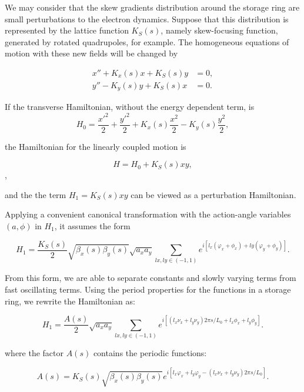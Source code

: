 We may consider that the skew gradients distribution around the storage ring are small perturbations to the electron dynamics. Suppose that this distribution is represented by the lattice function $K_S(s)$, namely skew-focusing function, generated by rotated quadrupoles, for example. The homogeneous equations of motion with these new fields will be changed by

\begin{align}
    x'' + K_x(s) x + K_S(s)y &=0, \\
    y'' - K_y(s) y + K_S(s)x &=0.
\end{align}

If the transverse Hamiltonian, without the energy dependent term, is 
\begin{equation*}
H_0 = \dfrac{{x'}^2}{2} + \dfrac{{y'}^2}{2} + K_x(s)\dfrac{{x}^2}{2} - K_y(s) \frac{y^2}{2},    
\end{equation*}

the Hamiltonian for the linearly coupled motion is 

\begin{equation*}
    H = H_0 + K_S(s) xy,
\end{equation*},

and the the term $H_1 = K_S(s) xy$ can be viewed as a perturbation Hamiltonian.

Applying a convenient canonical transformation with the action-angle variables $(a, \phi)$ in $H_1$, it assumes the form

\begin{equation*}
    H_1 = \dfrac{K_S(s)}{2}\sqrt{\beta_x(s)\beta_y(s)} \sqrt{a_x a_y} \sum_{lx, ly \in (-1, 1)} e^{i\left[l_x(\varphi_x + \phi_x) + ly(\varphi_y + \phi_y)\right]}.
\end{equation*}

From this form, we are able to separate constants and slowly varying terms from fast oscillating terms. Using the period properties for the functions in a storage ring, we rewrite the Hamiltonian as:

\begin{equation*}
    H_1 = \dfrac{A(s)}{2} \sqrt{a_x a_y} \sum_{lx, ly \in (-1, 1)} e^{i\left[\left(l_x\nu_x + l_y\nu_y\right)2\pi s/L_0 + l_x\phi_x + l_y\phi_y\right]}.
\end{equation*}

where the factor $A(s)$ contains the periodic functions:

\begin{equation*}
    A(s) = K_S(s) \sqrt{\beta_x(s) \beta_y(s)} e^{i\left[l_x\varphi_x + l_y\varphi_y - \left(l_x\nu_x + l_y\nu_y\right)2\pi s/L_0\right]}.
\end{equation*}


